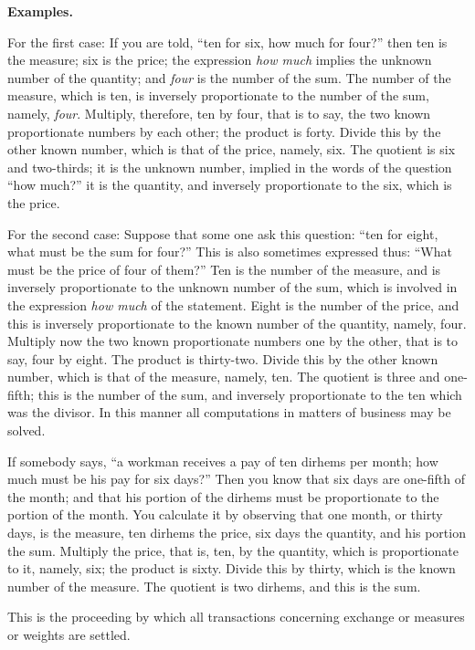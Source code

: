 \vspace{0.3cm}
\noindent\textbf{Examples.}

For the first case: If you are told, ``ten for six, how much for four?'' then ten is the measure; six is the price; the expression \textit{how much} implies the unknown number of the quantity; and \textit{four} is the number of the sum. The number of the measure, which is ten, is inversely proportionate to the number of the sum, namely, \textit{four}. Multiply, therefore, ten by four, that is to say, the two known proportionate numbers by each other; the product is forty. Divide this by the other known number, which is that of the price, namely, six. The quotient is six and two-thirds; it is the unknown number, implied in the words of the question ``how much?'' it is the quantity, and inversely proportionate to the six, which is the price.

For the second case: Suppose that some one ask this question: ``ten for eight, what must be the sum for four?'' This is also sometimes expressed thus: ``What must be the price of four of them?'' Ten is the number of the measure, and is inversely proportionate to the unknown number of the sum, which is involved in the expression \textit{how much} of the statement. Eight is the number of the price, and this is inversely proportionate to the known number of the quantity, namely, four. Multiply now the two known proportionate numbers one by the other, that is to say, four by eight. The product is thirty-two. Divide this by the other known number, which is that of the measure, namely, ten. The quotient is three and one-fifth; this is the number of the sum, and inversely proportionate to the ten which was the divisor. In this manner all computations in matters of business may be solved.

If somebody says, ``a workman receives a pay of ten dirhems per month; how much must be his pay for six days?'' Then you know that six days are one-fifth of the month; and that his portion of the dirhems must be proportionate to the portion of the month. You calculate it by observing that one month, or thirty days, is the measure, ten dirhems the price, six days the quantity, and his portion the sum. Multiply the price, that is, ten, by the quantity, which is proportionate to it, namely, six; the product is sixty. Divide this by thirty, which is the known number of the measure. The quotient is two dirhems, and this is the sum.

This is the proceeding by which all transactions concerning exchange or measures or weights are settled.

